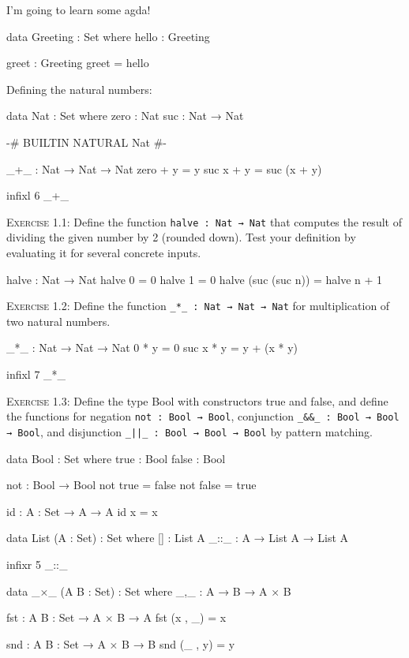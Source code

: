 \documentclass{article}
\newcommand{\ttx}{\texttt}
\begin{document}
\noindent
I'm going to learn some agda!

\begin{code}
data Greeting : Set where
    hello : Greeting

greet : Greeting
greet = hello
\end{code}

\noindent
Defining the natural numbers:

\begin{code}
data Nat : Set where
    zero : Nat
    suc : Nat → Nat

{-# BUILTIN NATURAL Nat #-}

_+_ : Nat → Nat → Nat
zero + y = y
suc x + y = suc (x + y)

infixl 6  _+_
\end{code}

\noindent
\textsc{Exercise 1.1}: Define the function \ttx{halve : Nat → Nat} that computes the result of dividing the given number by 2 (rounded down). Test your definition by evaluating it for several concrete inputs.

\begin{code}
halve : Nat → Nat
halve 0 = 0
halve 1 = 0
halve (suc (suc n)) = halve n + 1
\end{code}

\noindent
\textsc{Exercise 1.2}: Define the function \ttx{_*_ : Nat → Nat → Nat} for multiplication of two natural numbers.

\begin{code}
_*_ : Nat → Nat → Nat
0 * y = 0
suc x * y = y + (x * y)

infixl 7  _*_
\end{code}

\noindent
\textsc{Exercise 1.3}: Define the type Bool with constructors true and false, and define the functions for negation \verb$not : Bool → Bool$, conjunction \verb$_&&_ : Bool → Bool → Bool$, and disjunction \verb$_||_ : Bool → Bool → Bool$ by pattern matching.

\begin{code}
data Bool : Set where
    true : Bool
    false : Bool

not : Bool → Bool
not true = false
not false = true
\end{code}

\begin{code}
id : {A : Set} → A → A
id x = x

data List (A : Set) : Set where
    [] : List A
    _::_ : A → List A → List A

infixr 5 _::_

data _×_ (A B : Set) : Set where
    _,_ : A → B → A × B

fst : {A B : Set} → A × B → A
fst (x , _) = x

snd : {A B : Set} → A × B → B
snd (_ , y) = y
\end{code}
\end{document}

